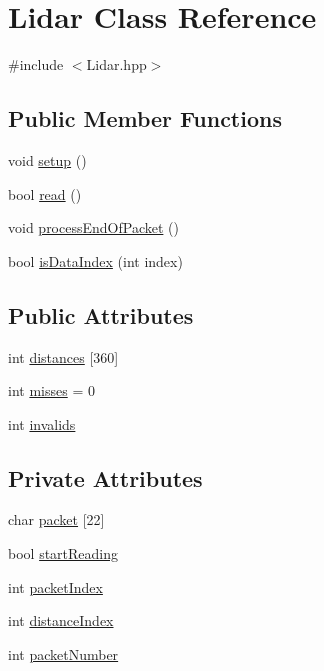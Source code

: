 \hypertarget{classLidar}{\section{Lidar Class Reference}
\label{classLidar}
}


{\ttfamily \#include $<$Lidar.\-hpp$>$}

\subsection*{Public Member Functions}
\begin{DoxyCompactItemize}
\item 
void \hyperlink{classLidar_abbb8e57bb39cb156cd03b9274843b32d}{setup} ()
\item 
bool \hyperlink{classLidar_a424a60f6278617333201c5fca115c288}{read} ()
\item 
void \hyperlink{classLidar_a64a54013a7ef0612c3c0f9f89dc93024}{process\-End\-Of\-Packet} ()
\item 
bool \hyperlink{classLidar_aefa743ccb6305927a312f9579e003f82}{is\-Data\-Index} (int index)
\end{DoxyCompactItemize}
\subsection*{Public Attributes}
\begin{DoxyCompactItemize}
\item 
int \hyperlink{classLidar_a5f97323ace606c1b4d2f817ebb8ebf7d}{distances} \mbox{[}360\mbox{]}
\item 
int \hyperlink{classLidar_a8eea2300d585c1b514ac6211a7326aca}{misses} = 0
\item 
int \hyperlink{classLidar_a43a0f4c1f8d6b0c9f1b21be32c99890d}{invalids}
\end{DoxyCompactItemize}
\subsection*{Private Attributes}
\begin{DoxyCompactItemize}
\item 
char \hyperlink{classLidar_a59f93afd1061d31642d1e7755838f2d1}{packet} \mbox{[}22\mbox{]}
\item 
bool \hyperlink{classLidar_a69b0909cc44f4e4e155d0ae2aa4ef3b4}{start\-Reading}
\item 
int \hyperlink{classLidar_a5e06436eae4b2d150501df175ec04758}{packet\-Index}
\item 
int \hyperlink{classLidar_a5d198ec3f5d3de7829dda616ea13d016}{distance\-Index}
\item 
int \hyperlink{classLidar_abcca8f7f6c4cff325e6b225ddbe14796}{packet\-Number}
\end{DoxyCompactItemize}


